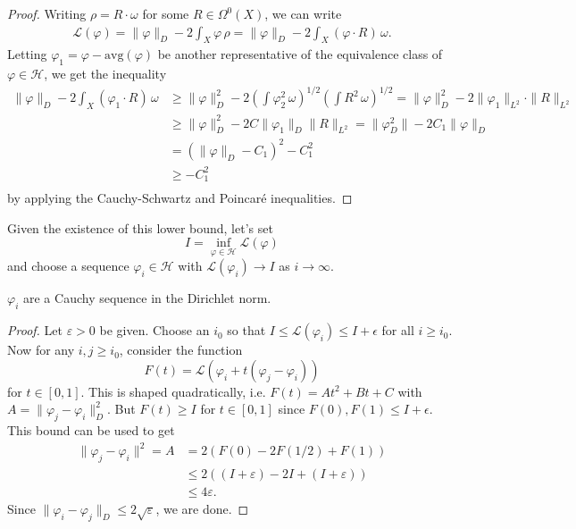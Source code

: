 \documentclass{lkx_paper}
\begin{document}
\begin{proof}
	Writing $\rho = R\cdot \omega$ for some $R\in \Omega^0(X)$, we can write
	\[
		\begin{aligned}
			\mathcal{L}(\varphi) = \|\varphi\|_D - 2\int_X \varphi\, \rho = \|\varphi\|_D - 2\int_X (\varphi\cdot R)\, \omega.
		\end{aligned}
	\]
	Letting $\varphi_1 = \varphi - \textrm{avg}(\varphi)$ be another representative of the equivalence class of $\varphi\in \mathcal{H}$, we get the inequality
	\[
		\begin{aligned}
			\|\varphi\|_D - 2\int_X (\varphi_1\cdot R)\, \omega
			 & \geq \|\varphi\|_D^2 - 2\left(\int \varphi_2^2\, \omega\right)^{1/2}\left(\int R^2\,\omega\right)^{1/2}
			=\|\varphi\|_D^2 - 2\|\varphi_1\|_{L^2} \cdot \|R\|_{L^2}                                                  \\
			 & \geq \|\varphi\|_D^2 - 2C\|\varphi_1\|_D\|R\|_{L^2}
			= \|\varphi_D^2\|- 2C_1\|\varphi\|_D                                                                       \\
			 & = \left(\|\varphi\|_D - C_1\right)^2 - C_1^2                                                            \\
			 & \geq -C_1^2                                                                                             \\
		\end{aligned}
	\]
	by applying the Cauchy-Schwartz and Poincar\'e inequalities.
\end{proof}

Given the existence of this lower bound, let's set \[I=\inf_{\varphi\in\mathcal{H}} \mathcal{L}(\varphi)\] and choose a sequence $\varphi_i\in\mathcal{H}$ with $\mathcal{L}(\varphi_i)\to I$ as $i\to \infty$.

\begin{lemma}
	$\varphi_i$ are a Cauchy sequence in the Dirichlet norm.
\end{lemma}

\begin{proof}
	Let $\varepsilon > 0$ be given. Choose an $i_0$ so that $I \leq \mathcal{L}(\varphi_i) \leq I +\epsilon$ for all $i\geq i_0$.
	Now for any $i, j \geq i_0$, consider the function
	\[
		F(t) = \mathcal{L}(\varphi_i + t(\varphi_j - \varphi_i))
	\]
	for $t\in [0,1]$. This is shaped quadratically, i.e. $F(t) = At^2+Bt+C$ with $A = \|\varphi_j-\varphi_i\|^2_D$. But $F(t)\geq I$ for $t\in [0,1]$ since $F(0), F(1)\leq I +\epsilon$. This bound can be used to get
	\[
		\begin{aligned}
			\|\varphi_j - \varphi_i\|^2 = A & = 2\left( F(0) - 2F(1/2) + F(1)\right)                  \\
			                                & \leq 2\left((I+\varepsilon)-2I + (I+\varepsilon)\right) \\
			                                & \leq 4\varepsilon.
		\end{aligned}
	\]
	Since $\|\varphi_i - \varphi_j\|_D\leq 2\sqrt{\varepsilon}$, we are done.
\end{proof}
\end{document}
